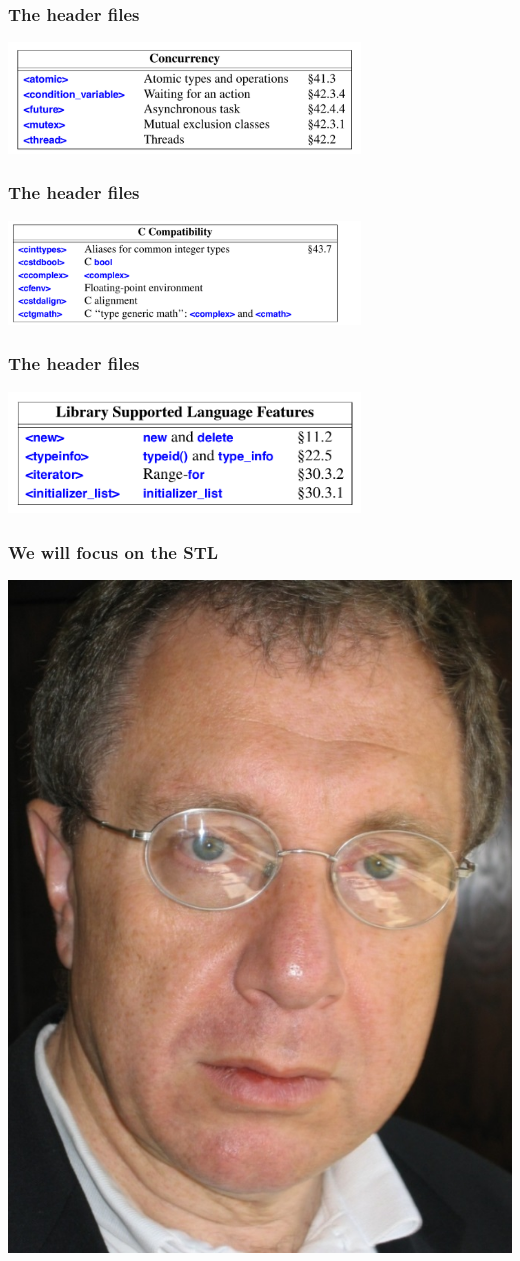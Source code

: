 \begin{frame}
  \frametitle{The header files}
  \centering
  \includegraphics[width=0.7\textwidth]{img/head_10.png}
\end{frame}
\begin{frame}
  \frametitle{The header files}
  \centering
  \includegraphics[width=0.7\textwidth]{img/head_11.png}
\end{frame}
\begin{frame}
  \frametitle{The header files}
  \centering
  \includegraphics[width=0.7\textwidth]{img/head_12.png}
\end{frame}

\begin{frame}
  \frametitle{We will focus on the STL}
  \centering
  \includegraphics[height=0.7\textheight]{img/alex.jpg}
\end{frame}
